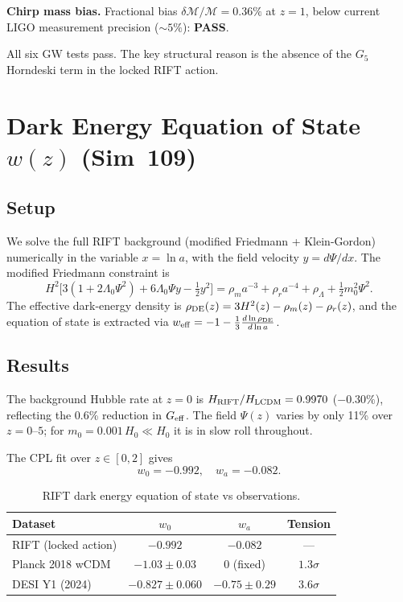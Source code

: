 \documentclass[12pt,a4paper]{article}
\begin{document}
\textbf{Chirp mass bias.} Fractional bias $\delta\mathcal{M}/\mathcal{M}=0.36\%$
at $z=1$, below current LIGO measurement precision ($\sim5\%$): \textbf{PASS}.

All six GW tests pass.  The key structural reason is the absence of the $G_5$
Horndeski term in the locked RIFT action.

\section{Dark Energy Equation of State $w(z)$ (Sim~109)}
\label{sec:sim109}

\subsection{Setup}

We solve the full RIFT background (modified Friedmann + Klein-Gordon)
numerically in the variable $x=\ln a$, with the field velocity
$y=d\Psi/dx$.  The modified Friedmann constraint is
\begin{equation}
  H^2\bigl[3(1+2\Lambda_0\Psi^2) + 6\Lambda_0\Psi y - \tfrac{1}{2}y^2\bigr]
  = \rho_m a^{-3} + \rho_r a^{-4} + \rho_\Lambda + \tfrac{1}{2}m_0^2\Psi^2 .
\end{equation}
The effective dark-energy density is $\rho_{\rm DE}(z) = 3H^2(z) - \rho_m(z) - \rho_r(z)$,
and the equation of state is extracted via
$w_{\rm eff} = -1 - \frac{1}{3}\frac{d\ln\rho_{\rm DE}}{d\ln a}$.

\subsection{Results}

The background Hubble rate at $z=0$ is $H_{\rm RIFT}/H_{\rm LCDM}=0.9970$
($-0.30\%$), reflecting the 0.6\% reduction in $G_{\rm eff}$.
The field $\Psi(z)$ varies by only 11\% over $z=0$--$5$; for
$m_0=0.001\,H_0\ll H_0$ it is in slow roll throughout.

The CPL fit over $z\in[0,2]$ gives
\begin{equation}
  w_0 = -0.992,\quad w_a = -0.082 .
\end{equation}

\begin{table}[h]
\centering
\caption{RIFT dark energy equation of state vs observations.}
\begin{tabular}{lccc}
\hline
Dataset & $w_0$ & $w_a$ & Tension \\
\hline
RIFT (locked action) & $-0.992$ & $-0.082$ & --- \\
Planck 2018 wCDM     & $-1.03\pm0.03$ & $0$ (fixed) & $1.3\sigma$ \\
DESI Y1 (2024)       & $-0.827\pm0.060$ & $-0.75\pm0.29$ & $3.6\sigma$ \\
\hline
\end{tabular}
\label{tab:wde}
\end{table}
\end{document}
